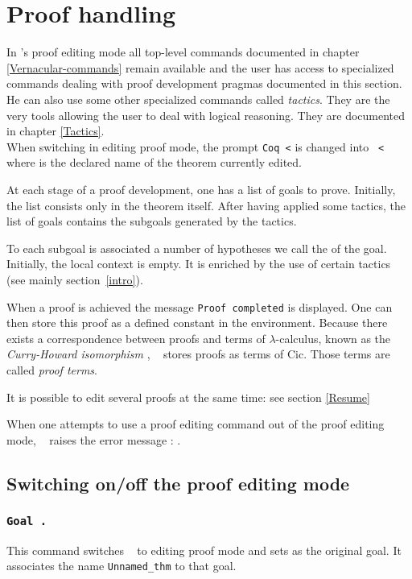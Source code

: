 \chapter[Proof handling]{Proof handling
\label{Proof-handling}}

In \Coq's proof editing mode all top-level commands documented in 
chapter \ref{Vernacular-commands} remain available
and the user has access to specialized commands dealing with proof
development pragmas documented in this section. He can also use some
other specialized commands called {\em tactics}.  They are the very
tools allowing the user to deal with logical reasoning. They are
documented in chapter \ref{Tactics}.\\ 
When switching in editing proof mode, the prompt
{\tt Coq <} is changed into {\tt {\ident} <} where {\ident} is the
declared name of the theorem currently edited.

At each stage of a proof development, one has a list of goals to
prove. Initially, the list consists only in the theorem itself. After
having applied some tactics, the list of goals contains the subgoals
generated by the tactics.

To each subgoal is associated  a number of
hypotheses we call the {\em {}} of the goal.
Initially, the local context is empty. It is enriched by the use of
certain tactics (see mainly section~\ref{intro}).

When a proof is achieved the message {\tt Proof completed} is
displayed. One can then store this proof as a defined constant in the
environment. Because there exists a correspondence between proofs and
terms of $\lambda$-calculus, known as the {\em Curry-Howard
isomorphism} \cite{How80,Bar91,Gir89,Hue89}, \Coq~ stores proofs as
terms of {\sc Cic}. Those terms are called {\em proof
  terms}.

It is possible to edit several proofs at the same time: see section
\ref{Resume}

\ErrMsg When one attempts to use a proof editing command out of the
proof editing mode, \Coq~ raises the error message : .

\section{Switching on/off the proof editing mode}

\subsection[\tt Goal {\form}.]{\tt Goal {\form}.\label{Goal}}
This command switches \Coq~ to editing proof mode and sets {\form} as
the original goal. It associates the name {\tt Unnamed\_thm} to
that goal.

